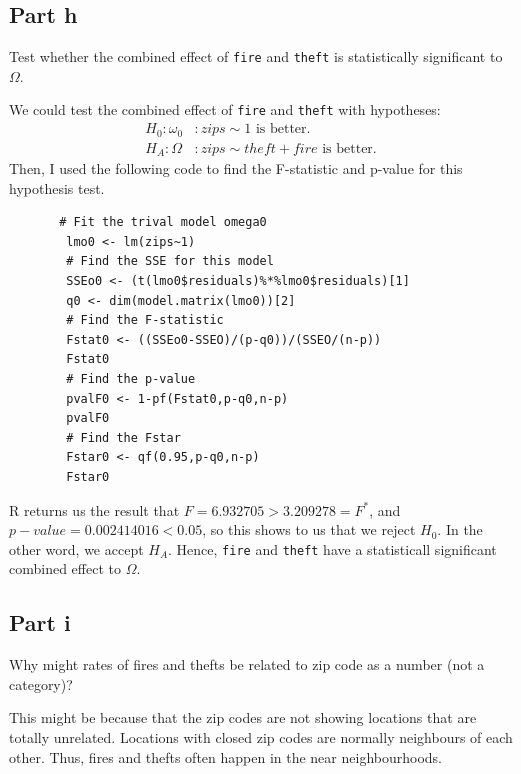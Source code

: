 \subsection{Part h}

\begin{question}
    Test whether the combined effect of \verb+fire+ and \verb+theft+ is statistically significant to $\Omega$.
\end{question}

\begin{answer}
     We could test the combined effect of \verb+fire+ and \verb+theft+ with hypotheses:
    \begin{align}
        H_0: \omega_0 &: zips \sim 1 \text{ is better.}\\
        H_A: \Omega &: zips \sim theft + fire \text{ is better.}
    \end{align}
    Then, I used the following code to find the F-statistic and p-value for this hypothesis test.
    \begin{verbatim}
       # Fit the trival model omega0
        lmo0 <- lm(zips~1)
        # Find the SSE for this model
        SSEo0 <- (t(lmo0$residuals)%*%lmo0$residuals)[1]
        q0 <- dim(model.matrix(lmo0))[2]
        # Find the F-statistic
        Fstat0 <- ((SSEo0-SSEO)/(p-q0))/(SSEO/(n-p))
        Fstat0
        # Find the p-value
        pvalF0 <- 1-pf(Fstat0,p-q0,n-p)
        pvalF0
        # Find the Fstar
        Fstar0 <- qf(0.95,p-q0,n-p)
        Fstar0
    \end{verbatim}
    R returns us  the result that $F = 6.932705 > 3.209278 = F^{*}$, and $p-value = 0.002414016 < 0.05$, so this shows to us that we reject $H_0$. In the other word, we accept $H_A$. Hence, \verb+fire+ and \verb+theft+ have a statisticall significant combined effect to $\Omega$.
\end{answer}

\subsection{Part i}

\begin{question}
    Why might rates of fires and thefts be related to zip code as a number (not a category)?
\end{question}
   
\begin{answer}
    This might be because that the zip codes are not showing locations that are totally unrelated. Locations with closed zip codes are normally neighbours of each other. Thus, fires and thefts often happen in the near neighbourhoods. 
\end{answer}

